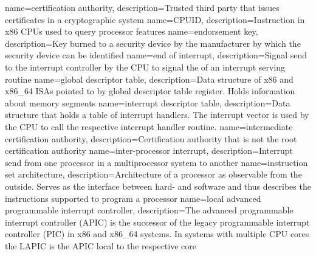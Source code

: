 
%
{
    name=certification authority,
    description={Trusted third party that issues certificates in a cryptographic system}
}
{
    name=CPUID,
    description={Instruction in x86 CPUs used to query processor features}
}
%
{
    name=endorsement key,
    description={Key burned to a security device by the manufacturer by which the security device can be identified}
}
{
    name=end of interrupt,
    description={Signal send to the interrupt controller by the CPU to signal the of an interrupt serving routine}
}
%
{
    name=global descriptor table,
    description={Data structure of x86 and x86\_64 ISAs pointed to by global descriptor table register.
            Holds information about memory segments}
}
%
{
    name=interrupt descriptor table,
    description={Data structure that holds a table of interrupt handlers. The interrupt vector is used by the CPU to
            call the respective interrupt handler routine.}
}
{
    name=intermediate certification authority,
    description={Certification authority that is not the root certification authority}
}
{
    name=inter-processor interrupt,
    description={Interrupt send from one processor in a multiprocessor system to another}
}
{
    name=instruction set architecture,
    description={Architecture of a processor as observable from the outside. Serves as the interface between hard- and
            software and thus describes the instructions supported to program a processor}
}
%
{
    name=local advanced programmable interrupt controller,
    description={The advanced programmable interrupt controller (APIC) is the successor of the legacy programmable
            interrupt controller (PIC) in x86 and x86\_64 systems. In systems with multiple CPU cores the LAPIC is the
            APIC local to the respective core}
}
